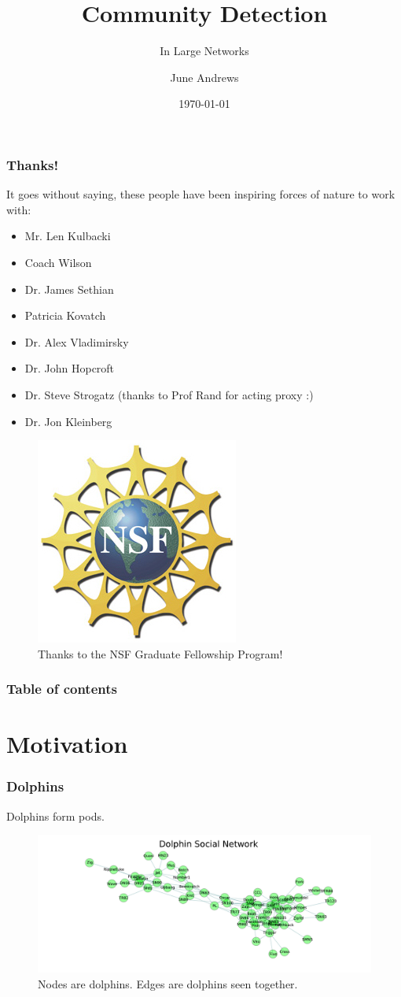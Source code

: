 \documentclass{beamer}
\begin{document}
\title{Community Detection}
\subtitle{In Large Networks}
\author{June Andrews}
\date{\today} 

\begin{frame}
\titlepage
\end{frame}


\begin{frame}\frametitle{Thanks!}
It goes without saying, these people have been inspiring forces of nature to work with:
\begin{itemize}
\item Mr. Len Kulbacki
\item Coach Wilson
\item Dr. James Sethian
\item Patricia Kovatch
\item Dr. Alex Vladimirsky
\item Dr. John Hopcroft
\item Dr. Steve Strogatz (thanks to Prof Rand for acting proxy :)
\item Dr. Jon Kleinberg
\end{itemize}

\begin{figure}
\includegraphics[width=.7in]{Figures/nsflogo} 
\caption{Thanks to the NSF Graduate Fellowship Program!}
\end{figure}

\end{frame}

\begin{frame}\frametitle{Table of contents}\tableofcontents
\end{frame} 


\section{Motivation}

\begin{frame}\frametitle{Dolphins}
Dolphins form pods.
\begin{figure}
\includegraphics[width=5in]{Figures/dolphin_social_network}
\caption{Nodes are dolphins.  Edges are dolphins seen together.}
\end{figure}
\end{frame}
\end{document}
